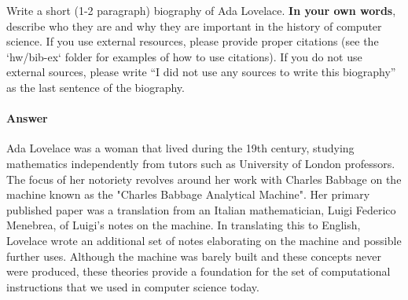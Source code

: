 \documentclass{article}
\begin{document}

Write a short (1-2 paragraph) biography of Ada Lovelace.
\textbf{In your own words}, describe who they are and why they are important in
the history of computer science.  If you use external resources, please provide
proper citations (see the `hw/bib-ex` folder for examples of how to use
citations). If you do not use external sources, please write ``I did not
use any sources to write this biography'' as the last sentence of the
biography.

\paragraph{Answer}

Ada Lovelace was a woman that lived during the 19th century, studying mathematics independently from tutors such as University of London professors. The focus of her notoriety revolves around her work with Charles Babbage on the machine known as the "Charles Babbage Analytical Machine". Her primary published paper was a translation from an Italian mathematician, Luigi Federico Menebrea, of Luigi's notes on the machine. In translating this to English, Lovelace wrote an additional set of notes elaborating on the machine and possible further uses. Although the machine was barely built and these concepts never were produced, these theories provide a foundation for the set of computational instructions that we used in computer science today.

% 
% 
\end{document}
